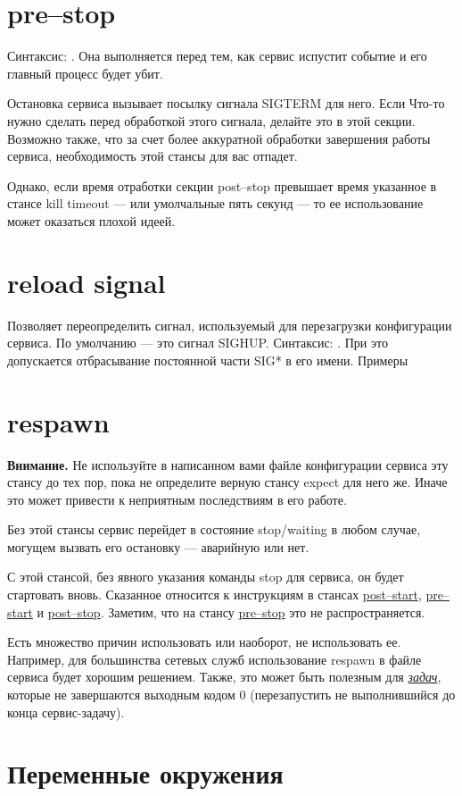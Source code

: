\section{pre--stop} \label{sec:PreStop}
Синтаксис: . Она выполняется перед тем, как сервис испустит событие  и его главный процесс будет убит.

Остановка сервиса вызывает посылку сигнала SIGTERM для него. Если Что-то нужно сделать перед обработкой этого сигнала, делайте это в этой секции. Возможно также, что за счет более аккуратной обработки завершения работы сервиса, необходимость этой стансы для вас отпадет. 

Однако, если время отработки секции post--stop превышает время указанное в стансе kill timeout --- или умолчальные пять секунд --- то ее использование может оказаться плохой идеей.
\section{reload signal} \label{sec:ReloadSignal}
Позволяет переопределить сигнал, используемый для перезагрузки конфигурации сервиса. По умолчанию --- это сигнал SIGHUP. Синтаксис: . При это допускается отбрасывание постоянной части SIG* в его имени. Примеры \begin{alltt}
\end{alltt}
\section{respawn} \label{sec:respawn}
\textbf{Внимание.} Не используйте в написанном вами файле конфигурации сервиса эту стансу до тех пор, пока не определите верную стансу expect для него же. Иначе это может привести к неприятным последствиям в его работе.

Без этой стансы сервис перейдет в состояние stop/waiting в любом случае, могущем вызвать его остановку --- аварийную или нет.

С этой стансой, без явного указания команды stop для сервиса, он будет стартовать вновь. Сказанное относится к инструкциям в стансах \hyperref[sec:PostStart]{post--start}, \hyperref[sec:PreStart]{pre--start} и \hyperref[sec:PostStop]{post--stop}. Заметим, что на стансу \hyperref[sec:PreStop]{pre--stop} это не распространяется.

Есть множество причин использовать или наоборот, не использовать ее. Например, для большинства сетевых служб использование respawn в файле сервиса будет хорошим решением. Также, это может быть полезным для \hyperref[sec:Task]{\it задач}, которые не завершаются выходным кодом 0 (перезапустить не выполнившийся до конца сервис-задачу).
\section{Переменные окружения} \label{sec:EnviromentVariables}